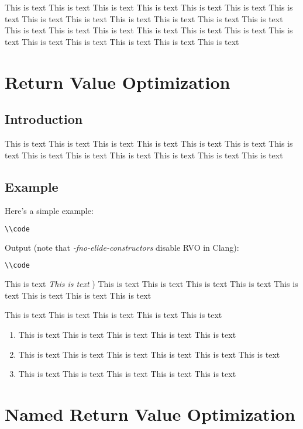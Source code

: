 \documentclass[a4paper]{uestcreport}
\begin{document}
This is text This is text This is text This is text This is text This is text This is text This is text This is text This is text 
This is text This is text This is text This is text This is text This is text This is text This is text This is text This is text 
This is text This is text This is text This is text This is text 

\section{Return Value Optimization}
\subsection{Introduction}
This is text This is text This is text This is text This is text This is text This is text 
This is text This is text This is text This is text This is text This is text 
\subsection{Example}
Here's a simple example:
\begin{lstlisting}[language=C++]
\\code
\end{lstlisting}

Output (note that \textit{-fno-elide-constructors} disable RVO in Clang):
\begin{lstlisting}[language=sh]
\\code
\end{lstlisting}

This is text  \textit{This is text }) This is text This is text This is text This is text This is text This is text This is text This is text 

This is text This is text This is text This is text This is text 
\begin{enumerate}
    \item This is text This is text This is text This is text This is text 
    \item This is text This is text This is text This is text This is text This is text 
    \item This is text This is text This is text This is text This is text 
\end{enumerate}


\section{Named Return Value Optimization}
\end{document}
